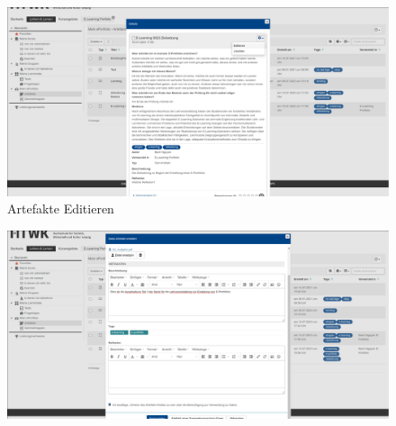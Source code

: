 \documentclass[a4paper,oneside]{scrarticle}
\begin{document}
	\begin{figure}[h]
		\centering
		\includegraphics[width=0.5\linewidth]{006_ArtefakteEditieren}
		\caption{Artefakte Editieren}
		\label{fig:006artefakteeditieren}
	\end{figure}
	\begin{figure}[h]
		\centering
		\includegraphics[width=0.5\linewidth]{007_ArtefakteHinzufugen}
		\caption{}
		\label{fig:007artefaktehinzufugen}
	\end{figure}
	
	
\end{document}
